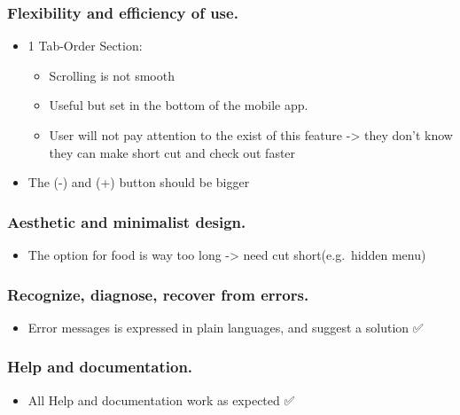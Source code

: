 \documentclass[
]{article}
\providecommand{\tightlist}{%
  \setlength{\itemsep}{0pt}\setlength{\parskip}{0pt}}
\begin{document}
\hypertarget{flexibility-and-efficiency-of-use.}{%
\subsubsection{Flexibility and efficiency of
use.}\label{flexibility-and-efficiency-of-use.}}

\begin{itemize}
\tightlist
\item
  1 Tab-Order Section:

  \begin{itemize}
  \tightlist
  \item
    Scrolling is not smooth
  \item
    Useful but set in the bottom of the mobile app.
  \item
    User will not pay attention to the exist of this feature
    -\textgreater{} they don't know they can make short cut and check
    out faster
  \end{itemize}
\end{itemize}

\begin{itemize}
\tightlist
\item
  The (-) and (+) button should be bigger
\end{itemize}

\hypertarget{aesthetic-and-minimalist-design.}{%
\subsubsection{Aesthetic and minimalist
design.}\label{aesthetic-and-minimalist-design.}}

\begin{itemize}
\tightlist
\item
  The option for food is way too long -\textgreater{} need cut
  short(e.g.~hidden menu)
\end{itemize}

\hypertarget{recognize-diagnose-recover-from-errors.}{%
\subsubsection{Recognize, diagnose, recover from
errors.}\label{recognize-diagnose-recover-from-errors.}}

\begin{itemize}
\tightlist
\item
  Error messages is expressed in plain languages, and suggest a solution
  ✅
\end{itemize}

\hypertarget{help-and-documentation.}{%
\subsubsection{Help and documentation.}\label{help-and-documentation.}}

\begin{itemize}
\tightlist
\item
  All Help and documentation work as expected ✅
\end{itemize}
\end{document}
